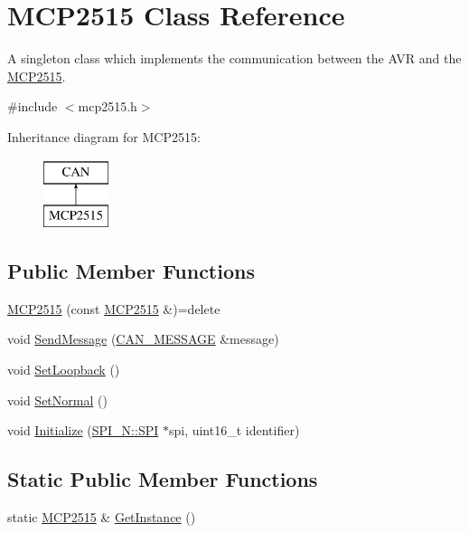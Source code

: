 \hypertarget{class_m_c_p2515}{}\section{M\+C\+P2515 Class Reference}
\label{class_m_c_p2515}


A singleton class which implements the communication between the A\+VR and the \hyperlink{class_m_c_p2515}{M\+C\+P2515}.  




{\ttfamily \#include $<$mcp2515.\+h$>$}

Inheritance diagram for M\+C\+P2515\+:\begin{figure}[H]
\begin{center}
\leavevmode
\includegraphics[height=2.000000cm]{class_m_c_p2515}
\end{center}
\end{figure}
\subsection*{Public Member Functions}
\begin{DoxyCompactItemize}
\item 
\hyperlink{class_m_c_p2515_a8cd4111604b740feb758bd4d077f4fb8}{M\+C\+P2515} (const \hyperlink{class_m_c_p2515}{M\+C\+P2515} \&)=delete
\item 
void \hyperlink{class_m_c_p2515_aa8c9fe944f7e6e99feb3f56a1c099a29}{Send\+Message} (\hyperlink{struct_c_a_n___m_e_s_s_a_g_e}{C\+A\+N\+\_\+\+M\+E\+S\+S\+A\+GE} \&message)
\item 
void \hyperlink{class_m_c_p2515_a7aac5fdb713b83933391348f1188f2b9}{Set\+Loopback} ()
\item 
void \hyperlink{class_m_c_p2515_a58601a9d30863ebac441d641ddfac44e}{Set\+Normal} ()
\item 
void \hyperlink{class_m_c_p2515_a60a93ccc1a0b21caaba5fda5f88117d2}{Initialize} (\hyperlink{class_s_p_i___n_1_1_s_p_i}{S\+P\+I\+\_\+\+N\+::\+S\+PI} $\ast$spi, uint16\+\_\+t identifier)
\end{DoxyCompactItemize}
\subsection*{Static Public Member Functions}
\begin{DoxyCompactItemize}
\item 
static \hyperlink{class_m_c_p2515}{M\+C\+P2515} \& \hyperlink{class_m_c_p2515_a3f53839a9258086fd21e2fc4190de60d}{Get\+Instance} ()
\end{DoxyCompactItemize}
